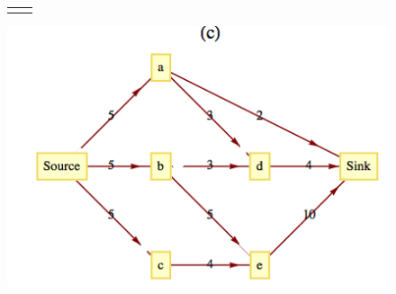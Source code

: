 \documentclass[10pt,]{book}
\theoremstyle{plain}
\theoremstyle{definition}
\theoremstyle{definition}
\theoremstyle{definition}
\theoremstyle{definition}
\theoremstyle{definition}
\numberwithin{equation}{section}
\newlength{\panelmax}
\begin{document}
\begin{exercisegroup}
{\settototalheight{\phAIimage}{\usebox{\panelboxAIimage}}
\setlength{\panelmax}{\maxof{\panelmax}{\phAIimage}}
\newsavebox{\panelboxAJimage}
\newlength{\phAJimage}\setlength{\phAJimage}{\ht\panelboxAJimage+\dp\panelboxAJimage}
\settototalheight{\phAJimage}{\usebox{\panelboxAJimage}}
\setlength{\panelmax}{\maxof{\panelmax}{\phAJimage}}
\leavevmode%
\setlength{\tabcolsep}{0\textwidth}
\begin{figure}
\begin{tabular}{@{}*{2}{c}@{}}
\begin{minipage}[c][\panelmax][t]{0.5\textwidth}\usebox{\panelboxAIimage}\end{minipage}&
\begin{minipage}[c][\panelmax][t]{0.5\textwidth}\usebox{\panelboxAJimage}\end{minipage}\end{tabular}
\end{figure}
}%
\leavevmode%
\begin{figure}
\centering
\includegraphics[width=1\linewidth]{images/fig-exercise-9-5-7c.png}
\end{figure}

\end{exercisegroup}
\end{document}

